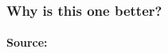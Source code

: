 \documentclass[handout]{beamer}
\begin{document}
\begin{frame}
\frametitle{Why is this one better?}
\framesubtitle{Source: \href{http://www.climatecentral.org/news/noaa-2012-was-warmest-and-second-most-extreme-year-on-record-15436}{}}
	\begin{figure}
\end{figure}
\end{frame}
\end{document}
